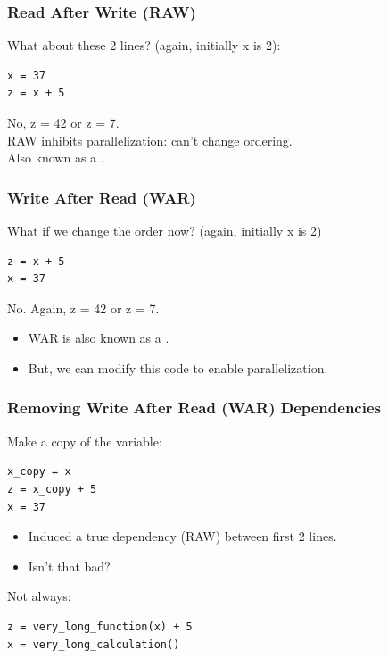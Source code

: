 \documentclass[aspectratio=43]{beamer}
\newenvironment{changemargin}[1]{%
  \begin{list}{}{%
    \setlength{\topsep}{0pt}%
    \setlength{\leftmargin}{#1}%
    \setlength{\rightmargin}{1em}
    \setlength{\listparindent}{\parindent}%
    \setlength{\itemindent}{\parindent}%
    \setlength{\parsep}{\parskip}%
  }%
  \item[]}{\end{list}}
\begin{document}
\begin{frame}[fragile]
\frametitle{Read After Write (RAW)}

\begin{changemargin}{2.5cm}
What about these 2 lines? (again, initially x is 2):
\begin{lstlisting}
x = 37
z = x + 5
\end{lstlisting}
\pause
\alert{No, z = 42 or z = 7.}\\[1em]

RAW inhibits parallelization: can't change ordering.\\
Also known as a .
\end{changemargin}
\end{frame}

\begin{frame}[fragile]
\frametitle{Write After Read (WAR)}
\begin{changemargin}{2.5cm}
What if we change the order now? (again, initially x is 2)
\begin{lstlisting}
z = x + 5
x = 37
\end{lstlisting}
\pause
\alert{No. Again, z = 42 or z = 7.}\\[1em]
\begin{itemize}
\item WAR is also known as a .
\item But, we can modify this code to enable parallelization.
\end{itemize}
\end{changemargin}
\end{frame}

\begin{frame}[fragile]
\frametitle{Removing Write After Read (WAR) Dependencies}
\begin{changemargin}{1.8cm}
Make a copy of the variable:
\begin{lstlisting}
x_copy = x
z = x_copy + 5
x = 37
\end{lstlisting}
\pause
{}
\begin{itemize}
\item Induced a true dependency (RAW) between first 2 lines.
\item Isn't that bad?
\end{itemize}
\pause
Not always:
\begin{lstlisting}
z = very_long_function(x) + 5
x = very_long_calculation()
\end{lstlisting}
\end{changemargin}
\end{frame}
\end{document}
